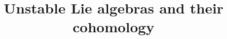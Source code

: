 \documentclass[11pt]{amsart}
\title[Unstable Lie algebras and their cohomology]{Unstable Lie algebras and their cohomology}
\theoremstyle{plain}
\theoremstyle{definition}
\theoremstyle{plain}
\begin{document}
\newcommand{\todo}[2]{\begin{shaded}\begin{itemize}
\setlength{\parindent}{.25in}
\item[{\Large$\smash\diamondsuit$}] #1
\ifblank{#2}{}{\tiny\begin{itemize}
\setlength{\parindent}{.25in}
\item #2
\end{itemize}}
\end{itemize}\end{shaded}
}
\newcommand{\todoeasy}[2]{\begin{shaded}\begin{itemize}
\setlength{\parindent}{.25in}
\item[{\Large$\smash\spadesuit$}] #1
\ifblank{#2}{}{\tiny\begin{itemize}
\setlength{\parindent}{.25in}
\item #2
\end{itemize}}
\end{itemize}\end{shaded}
}

\begin{Contents Page}
\tableofcontents
\end{Contents Page}
\end{document}

